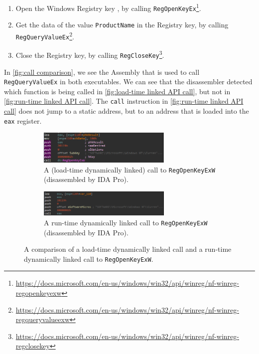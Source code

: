 \begin{enumerate}
    \item Open the Windows Registry key , by calling \texttt{RegOpenKeyEx}\footnote{\tiny \url{https://docs.microsoft.com/en-us/windows/win32/api/winreg/nf-winreg-regopenkeyexw}}.

    \item Get the data of the value \texttt{ProductName} in the Registry key, by calling \texttt{RegQueryValueEx}\footnote{\tiny \url{https://docs.microsoft.com/en-us/windows/win32/api/winreg/nf-winreg-regqueryvalueexw}}.

    \item Close the Registry key, by calling \texttt{RegCloseKey}\footnote{\tiny \url{https://docs.microsoft.com/en-us/windows/win32/api/winreg/nf-winreg-regclosekey}}.
\end{enumerate}

In \autoref{fig:call comparison}, we see the Assembly that is used to call \texttt{RegQueryValueEx} in both executables. We can see that the disassembler detected which function is being called in \autoref{fig:load-time linked API call}, but not in \autoref{fig:run-time linked API call}. The \texttt{call} instruction in \autoref{fig:run-time linked API call} does not jump to a static address, but to an address that is loaded into the \texttt{eax} register.

\begin{figure}[ht]
    \centering
    \begin{subfigure}[ht]{\textwidth}
        \centering
        \includegraphics[width=0.7\textwidth]{resources/images/load_time_api_call_disassembler.png}
        \caption{A (load-time dynamically linked) call to \texttt{RegOpenKeyExW} (disassembled by IDA Pro).}
        \label{fig:load-time linked API call}
    \end{subfigure}
    \hfill
    \begin{subfigure}[ht]{\textwidth}
        \centering
        \includegraphics[width=0.7\textwidth]{resources/images/run_time_api_call_disassembler.png}
        \caption{A run-time dynamically linked call to \texttt{RegOpenKeyExW} (disassembled by IDA Pro).}
        \label{fig:run-time linked API call}
    \end{subfigure}
    \caption{A comparison of a load-time dynamically linked call and a run-time dynamically linked call to \texttt{RegOpenKeyExW}.}
    \label{fig:call comparison}
\end{figure}

